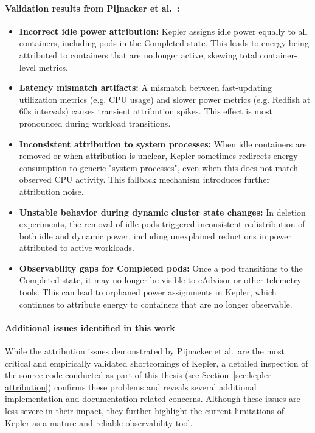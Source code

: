 \paragraph{Validation results from Pijnacker et al.~\parencite{pijnackerContainerlevelEnergyObservability2025}:}
\begin{itemize}
    \item \textbf{Incorrect idle power attribution:} Kepler assigns idle power equally to all containers, including pods in the Completed state. This leads to energy being attributed to containers that are no longer active, skewing total container-level metrics.
    \item \textbf{Latency mismatch artifacts:} A mismatch between fast-updating utilization metrics (e.g. CPU usage) and slower power metrics (e.g. Redfish at 60s intervals) causes transient attribution spikes. This effect is most pronounced during workload transitions.
    \item \textbf{Inconsistent attribution to system processes:} When idle containers are removed or when attribution is unclear, Kepler sometimes redirects energy consumption to generic "system processes", even when this does not match observed CPU activity. This fallback mechanism introduces further attribution noise.
    \item \textbf{Unstable behavior during dynamic cluster state changes:} In deletion experiments, the removal of idle pods triggered inconsistent redistribution of both idle and dynamic power, including unexplained reductions in power attributed to active workloads.
    \item \textbf{Observability gaps for Completed pods:} Once a pod transitions to the Completed state, it may no longer be visible to cAdvisor or other telemetry tools. This can lead to orphaned power assignments in Kepler, which continues to attribute energy to containers that are no longer observable.
\end{itemize}

\paragraph{Additional issues identified in this work}
While the attribution issues demonstrated by Pijnacker et al.\ are the most critical and empirically validated shortcomings of Kepler, a detailed inspection of the source code conducted as part of this thesis (see Section~\ref{sec:kepler-attribution}) confirms these problems and reveals several additional implementation and documentation-related concerns. Although these issues are less severe in their impact, they further highlight the current limitations of Kepler as a mature and reliable observability tool.

